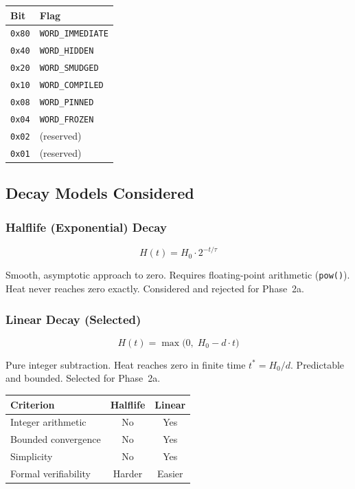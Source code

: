 \begin{center}
\begin{tabular}{ll}
\toprule
Bit & Flag \\
\midrule
\texttt{0x80} & \texttt{WORD\_IMMEDIATE} \\
\texttt{0x40} & \texttt{WORD\_HIDDEN} \\
\texttt{0x20} & \texttt{WORD\_SMUDGED} \\
\texttt{0x10} & \texttt{WORD\_COMPILED} \\
\texttt{0x08} & \texttt{WORD\_PINNED} \\
\texttt{0x04} & \texttt{WORD\_FROZEN} \\
\texttt{0x02} & (reserved) \\
\texttt{0x01} & (reserved) \\
\bottomrule
\end{tabular}
\end{center}

\subsection{Decay Models Considered}

\subsubsection{Halflife (Exponential) Decay}

\[
  H(t) = H_0 \cdot 2^{-t/\tau}
\]

Smooth, asymptotic approach to zero. Requires floating-point arithmetic
(\texttt{pow()}). Heat never reaches zero exactly. Considered and rejected
for Phase~2a.

\subsubsection{Linear Decay (Selected)}

\[
  H(t) = \max\!\bigl(0,\; H_0 - d \cdot t\bigr)
\]

Pure integer subtraction. Heat reaches zero in finite time $t^* = H_0/d$.
Predictable and bounded. Selected for Phase~2a.

\begin{center}
\begin{tabular}{lcc}
\toprule
Criterion & Halflife & Linear \\
\midrule
Integer arithmetic       & No  & Yes \\
Bounded convergence      & No  & Yes \\
Simplicity               & No  & Yes \\
Formal verifiability     & Harder & Easier \\
\bottomrule
\end{tabular}
\end{center}


